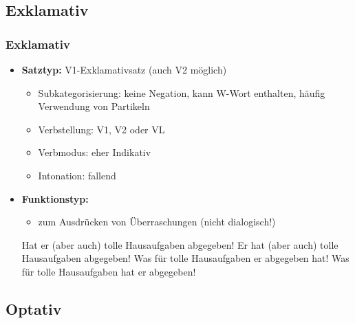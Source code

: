\subsection{Exklamativ}


\begin{frame}
\frametitle{Exklamativ}

\begin{itemize}
	\item \textbf{Satztyp:} V1-Exklamativsatz (auch V2 möglich)
	\begin{itemize}
		\item Subkategorisierung: keine Negation, kann W-Wort enthalten, häufig Verwendung von Partikeln
		\item Verbstellung: V1, V2 oder VL
		\item Verbmodus: eher Indikativ
		\item Intonation: fallend
	\end{itemize}
	\item \textbf{Funktionstyp:}
	\begin{itemize}
		\item zum Ausdrücken von Überraschungen (nicht dialogisch!)
	\end{itemize}
	
	\eal
	\ex Hat er (aber auch) tolle Hausaufgaben abgegeben!
	\ex Er hat (aber auch) tolle Hausaufgaben abgegeben!
	\ex Was für tolle Hausaufgaben er abgegeben hat!
	\ex Was für tolle Hausaufgaben hat er abgegeben!
	\zl
		
\end{itemize}

\end{frame}


\subsection{Optativ}


